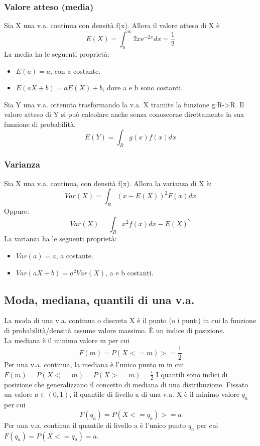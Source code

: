 \documentclass{article}
\begin{document}
\subsubsection{Valore atteso (media)}
Sia X una v.a. continua con densità f(x). Allora il valore atteso di X è
\begin{equation}
E(X) = \int_0^{\infty}{2xe^{-2x}dx = \frac{1}{2}}
\end{equation}
La media ha le seguenti proprietà:
\begin{itemize}
\item $E(a)=a$, con a costante.
\item $E(aX+b)=aE(X)+b$, dove a e b sono costanti.
\end{itemize}
Sia Y una v.a. ottenuta trasformando la v.a. X tramite la funzione g:R->R. Il valore atteso di Y si può calcolare anche senza conoscerne direttamente la sua funzione di probabilità.
\begin{equation}
E(Y)=\int_{R}g(x)f(x)dx
\end{equation}
\subsubsection{Varianza}
Sia X una v.a. continua, con densità f(x). Allora la varianza di X è:
\begin{equation}
Var(X)=\int_{R}{(x-E(X))^{2}F(x)dx}
\end{equation}
Oppure:
\begin{equation}
Var(X)=\int_{R}{x^{2}f(x)dx-E(X)^2}
\end{equation}
La varianza ha le seguenti proprietà:
\begin{itemize}
\item $Var(a) = a$, a costante.
\item $Var(aX+b)=a^{2}Var(X)$, a e b costanti.
\end{itemize}
\subsection{Moda, mediana, quantili di una v.a.}
La moda di una v.a. continua o discreta X è il punto (o i punti) in cui la funzione di probabilità/densità assume valore massimo. È un indice di posizione.\\
La mediana è il minimo valore m per cui
\begin{equation}
F(m)=P(X<=m)>=\frac{1}{2}
\end{equation}
Per una v.a. continua, la mediana è l'unico punto m in cui $F(m)=P(X<=m)=P(X>=m)=\frac{1}{2}$
I quantili sono indici di posizione che generalizzano il concetto di mediana di una distribuzione.
Fissato un valore ${a}\in{(0,1)}$, il quantile di livello a di una v.a. X è il minimo valore $q_a$ per cui
\begin{equation}
F(q_a)=P(X<=q_a)>=a
\end{equation}
Per una v.a. continua il quantile di livello a è l'unico punto $q_a$ per cui $F(q_a)=P(X<=q_a)=a$.
\end{document}
